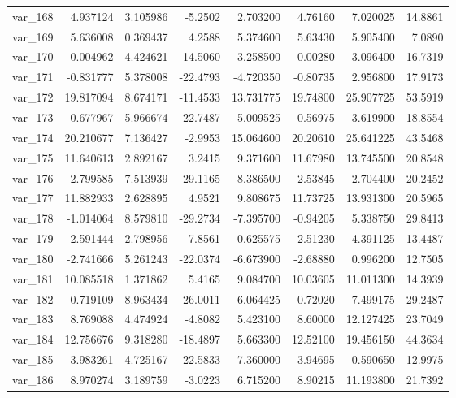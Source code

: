 ﻿\documentclass[12pt]{article}
\begin{document}
\begin{longtable}{lrrrrrrr}
 var\_168 &   4.937124 &   3.105986 &  -5.2502 &   2.703200 &   4.76160 &   7.020025 &  14.8861 \\
 var\_169 &   5.636008 &   0.369437 &   4.2588 &   5.374600 &   5.63430 &   5.905400 &   7.0890 \\
 var\_170 &  -0.004962 &   4.424621 & -14.5060 &  -3.258500 &   0.00280 &   3.096400 &  16.7319 \\
 var\_171 &  -0.831777 &   5.378008 & -22.4793 &  -4.720350 &  -0.80735 &   2.956800 &  17.9173 \\
 var\_172 &  19.817094 &   8.674171 & -11.4533 &  13.731775 &  19.74800 &  25.907725 &  53.5919 \\
 var\_173 &  -0.677967 &   5.966674 & -22.7487 &  -5.009525 &  -0.56975 &   3.619900 &  18.8554 \\
 var\_174 &  20.210677 &   7.136427 &  -2.9953 &  15.064600 &  20.20610 &  25.641225 &  43.5468 \\
 var\_175 &  11.640613 &   2.892167 &   3.2415 &   9.371600 &  11.67980 &  13.745500 &  20.8548 \\
 var\_176 &  -2.799585 &   7.513939 & -29.1165 &  -8.386500 &  -2.53845 &   2.704400 &  20.2452 \\
 var\_177 &  11.882933 &   2.628895 &   4.9521 &   9.808675 &  11.73725 &  13.931300 &  20.5965 \\
 var\_178 &  -1.014064 &   8.579810 & -29.2734 &  -7.395700 &  -0.94205 &   5.338750 &  29.8413 \\
 var\_179 &   2.591444 &   2.798956 &  -7.8561 &   0.625575 &   2.51230 &   4.391125 &  13.4487 \\
 var\_180 &  -2.741666 &   5.261243 & -22.0374 &  -6.673900 &  -2.68880 &   0.996200 &  12.7505 \\
 var\_181 &  10.085518 &   1.371862 &   5.4165 &   9.084700 &  10.03605 &  11.011300 &  14.3939 \\
 var\_182 &   0.719109 &   8.963434 & -26.0011 &  -6.064425 &   0.72020 &   7.499175 &  29.2487 \\
 var\_183 &   8.769088 &   4.474924 &  -4.8082 &   5.423100 &   8.60000 &  12.127425 &  23.7049 \\
 var\_184 &  12.756676 &   9.318280 & -18.4897 &   5.663300 &  12.52100 &  19.456150 &  44.3634 \\
 var\_185 &  -3.983261 &   4.725167 & -22.5833 &  -7.360000 &  -3.94695 &  -0.590650 &  12.9975 \\
 var\_186 &   8.970274 &   3.189759 &  -3.0223 &   6.715200 &   8.90215 &  11.193800 &  21.7392 \\

\end{longtable}
\end{document}
